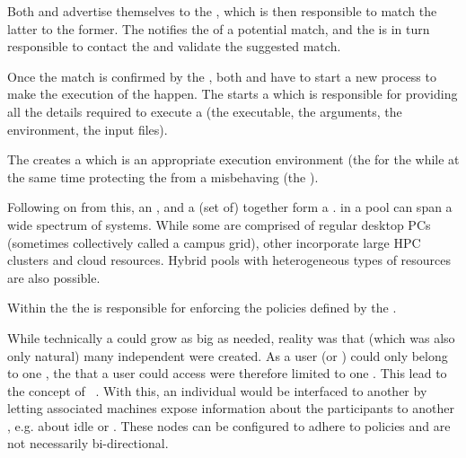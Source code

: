 \documentclass{sig-alternate}
\begin{document}
Both  and  advertise themselves to the
, which is then responsible to match the latter to the
former. The  notifies the  of a potential
match, and the  is in turn responsible to contact the
 and validate the suggested match.

Once the match is confirmed by the , both 
and  have to start a new process to make the execution of the
 happen. The  starts a  which
is responsible for providing all the details required to execute a
 (the executable, the arguments, the environment, the input
files).

The  creates a  which is an appropriate
execution environment (the  for the  while at the
same time protecting the  from a misbehaving 
(the ).

Following on from this, an ,  and a (set of)
 together form a .  in a pool
can span a wide spectrum of systems. While some  are comprised
of regular desktop PCs (sometimes collectively called a campus grid), other
 incorporate large HPC clusters and cloud resources.  Hybrid
pools with heterogeneous types of resources are also possible.

Within the  the  is responsible for enforcing
the policies defined by the .


%
%
While technically a  could grow as big as needed, reality was
that (which was also only natural) many independent  were created. As a user
(or ) could only belong to one , the
 that a user could access were therefore limited to one
. This lead to the concept of ~\cite{Epema:1996:flocking}. With this, an individual 
would be interfaced to another  by letting associated
 machines expose information about the 
participants to another , e.g. about idle  or
. These  nodes can be configured to adhere to
policies and are not necessarily bi-directional.
\end{document}
